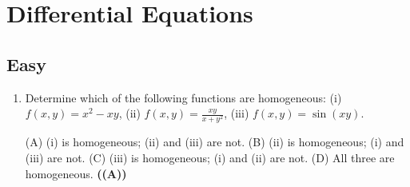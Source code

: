 \documentclass{article}
\begin{document}
\section{Differential Equations}
\subsection{Easy}
\begin{enumerate}
\item Determine which of the following functions are homogeneous:
(i) $f(x, y) = x^2 - xy$, (ii) $f(x, y) = \frac{xy}{x + y^2}$, (iii) $f(x, y) = \sin(xy)$.

(A) (i) is homogeneous; (ii) and (iii) are not.
(B) (ii) is homogeneous; (i) and (iii) are not.
(C) (iii) is homogeneous; (i) and (ii) are not.
(D) All three are homogeneous. \hfill \textbf{((A))}
\end{enumerate}
\end{document}
